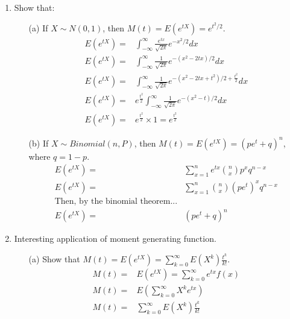 \documentclass{article}
\begin{document}
\begin{enumerate}
\item Show that:
    \begin{itemize}
    \item [(a)] If $X \sim N(0,1)$, then $M(t)=E(e^{tX})=e^{t^2/2}$.
        \begin{equation*}
        \begin{aligned}
        E(e^{tX}) = & \int_{-\infty}^{\infty} \frac{e^{tx}}{\sqrt{2\pi}} e^{-x^2 / 2} dx \\
        E(e^{tX}) = & \int_{-\infty}^{\infty} \frac{1}{\sqrt{2\pi}} e^{-(x^2 - 2tx) / 2} dx \\
        E(e^{tX}) = & \int_{-\infty}^{\infty} \frac{1}{\sqrt{2\pi}} e^{-(x^2 - 2tx + t^2) / 2 + \frac{t^2}{2}} dx \\
        E(e^{tX}) = & e^{\frac{t^2}{2}} \int_{-\infty}^{\infty} \frac{1}{\sqrt{2\pi}} e^{-(x^2 - t) / 2} dx \\
        E(e^{tX}) = & e^{\frac{t^2}{2}} \times 1 = e^{\frac{t^2}{2}}
        \end{aligned}
        \end{equation*}
    \item [(b)] If $X\sim Binomial (n,P)$, then $M(t)=E(e^{tX})=(pe^t+q)^n$, where $q=1-p$.
        \begin{equation*}
        \begin{aligned}
            E(e^{tX}) = & \sum_{x = 1}^n e^{tx} \binom{n}{x} p^x q^{n - x} \\
            E(e^{tX}) = & \sum_{x = 1}^n \binom{n}{x} (pe^t)^x q^{n - x} \\
            \text{Then, by the binomial theorem...} \\
            E(e^{tX}) = & (pe^t + q)^n
        \end{aligned}
        \end{equation*}
    \end{itemize}

\item Interesting application of moment generating function.
    \begin{itemize}
    \item [(a)] Show that $M(t)=E(e^{tX})=\sum_{k=0}^\infty E(X^k) \frac{t^k}{k!}$.
        \begin{equation*}
        \begin{aligned}
            M(t) =& E(e^{tX}) = \sum_{k = 0}^\infty e^{tx}f(x) \\
            M(t) =& E\left(\sum_{k = 0}^\infty X^k e^{tx}\right) \\
            M(t) =& \sum_{k = 0}^\infty E(X^k) \frac{t^k}{k!}
        \end{aligned}
        \end{equation*}
    \end{itemize}


\end{enumerate}
\end{document}
